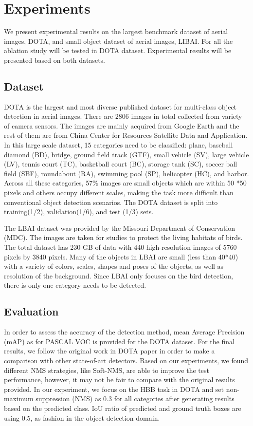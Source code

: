 \documentclass[conference]{IEEEtran}
\begin{document}
    

\section{Experiments}	
    We present experimental results on the largest benchmark dataset of aerial images, DOTA, and small object dataset of aerial images, LIBAI. For all the ablation study will be tested in DOTA dataset. Experimental results  will be presented based on both datasets.
    
	\subsection{Dataset}
	DOTA is the largest and most diverse published dataset for multi-class object detection in aerial images. There are 2806 images in total collected from variety of camera sensors. The images are mainly acquired from Google Earth and the rest of them are from China Center for Resources Satellite Data and Application. In this large scale dataset, 15 categories need to be classified: plane, baseball diamond (BD), bridge, ground field track (GTF), small vehicle (SV), large vehicle (LV), tennis court (TC), basketball court (BC), storage tank (SC), soccer ball field (SBF), roundabout (RA), swimming pool (SP), helicopter (HC), and harbor. Across all these categories, 57\% images are small objects which are within 50 *50 pixels and others occupy different scales, making the task more difficult than conventional object detection scenarios. The DOTA dataset is split into training(1/2), validation(1/6), and test (1/3) sets.
    
    The LBAI dataset was provided by the Missouri Department of Conservation (MDC). The images are taken for studies to protect the living habitats of birds. The total dataset has 230 GB of data with 440 high-resolution images of 5760 pixels by 3840 pixels. 
    Many of the objects in LBAI are small (less than 40*40) with a variety of colors, scales, shapes and poses of the objects, as well as resolution of the background. Since LBAI only focuses on the bird detection, there is only one category needs to be detected. 
    
    \subsection{Evaluation}
    In order to assess the accuracy of the detection method, mean Average Precision (mAP) as for PASCAL VOC\cite{everingham2010pascal} is provided for the DOTA dataset. For the final results, we follow the original work in DOTA paper in order to make a comparison with other state-of-art detectors. Based on our experiments, we found different NMS strategies, like Soft-NMS\cite{bodla2017soft}, are able to improve the test performance, however, it may not be fair to compare with the original results provided. In our experiment, we focus on the HBB task in DOTA and set non-maximum suppression (NMS) as 0.3 for all categories after generating results based on the predicted class. IoU ratio of predicted and ground truth boxes are using 0.5, as fashion in the object detection domain.
    
\end{document}
